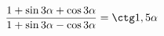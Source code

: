 \begin{ex}[type=prove_identity]
	\begin{condition}
		\( \dfrac{1+\sin3\alpha+\cos3\alpha}{1+\sin3\alpha-\cos3\alpha}=\ctg1,5\alpha \)
	\end{condition}
\end{ex}